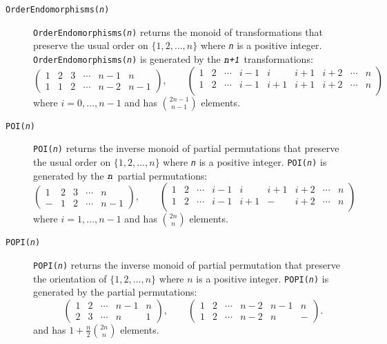 \documentclass[a4paper,11pt]{report}
\begin{document}
{{{ 
\begin{description}
\item[{\texttt{OrderEndomorphisms(\mbox{\texttt{\mdseries\slshape n}})}}]  \texttt{OrderEndomorphisms(\mbox{\texttt{\mdseries\slshape n}})} returns the monoid of transformations that preserve the usual order on $\{1,2,\ldots, n\}$ where \mbox{\texttt{\mdseries\slshape n}} is a positive integer.  \texttt{OrderEndomorphisms(\mbox{\texttt{\mdseries\slshape n}})} is generated by the $\mbox{\texttt{\mdseries\slshape n+1}}$ transformations: 
\[ \left( \begin{array}{ccccccccc} 1&2&3&\cdots&n-1& n\\ 1&1&2&\cdots&n-2&n-1
\end{array}\right), \qquad \left( \begin{array}{ccccccccc} 1&2&\cdots&i-1& i&
i+1&i+2&\cdots &n\\ 1&2&\cdots&i-1& i+1&i+1&i+2&\cdots &n\\ \end{array}\right) \]
 where $i=0,\ldots,n-1$ and has ${2n-1\choose n-1}$ elements.  
\item[{\texttt{POI(\mbox{\texttt{\mdseries\slshape n}})}}]  \texttt{POI(\mbox{\texttt{\mdseries\slshape n}})} returns the inverse monoid of partial permutations that preserve the usual
order on $\{1,2,\ldots, n\}$ where \mbox{\texttt{\mdseries\slshape n}} is a positive integer.  \texttt{POI(\mbox{\texttt{\mdseries\slshape n}})} is generated by the $\mbox{\texttt{\mdseries\slshape n}}$ partial permutations: 
\[ \left( \begin{array}{ccccc} 1&2&3&\cdots&n\\ -&1&2&\cdots&n-1
\end{array}\right), \qquad \left( \begin{array}{ccccccccc} 1&2&\cdots&i-1& i&
i+1&i+2&\cdots &n\\ 1&2&\cdots&i-1& i+1&-&i+2&\cdots&n\\ \end{array}\right) \]
 where $i=1, \ldots, n-1$ and has ${2n\choose n}$ elements.  
\item[{\texttt{POPI(\mbox{\texttt{\mdseries\slshape n}})}}]  \texttt{POPI(\mbox{\texttt{\mdseries\slshape n}})} returns the inverse monoid of partial permutation that preserve the
orientation of $\{1,2,\ldots, n\}$ where $n$ is a positive integer.  \texttt{POPI(\mbox{\texttt{\mdseries\slshape n}})} is generated by the partial permutations: 
\[ \left( \begin{array}{ccccc} 1&2&\cdots&n-1&n\\ 2&3&\cdots&n&1
\end{array}\right),\qquad \left( \begin{array}{cccccc} 1&2&\cdots&n-2&n-1&n\\
1&2&\cdots&n-2&n&- \end{array}\right). \]
 and has $1+\frac{n}{2}{2n\choose n}$ elements.  
\end{description}
 
}}}
\end{document}
